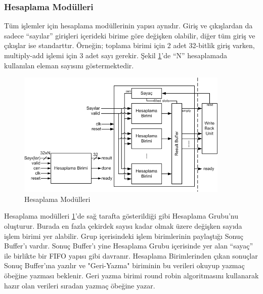 \subsubsection{Hesaplama Modülleri}
Tüm işlemler için hesaplama modüllerinin yapısı aynıdır. Giriş ve çıkışlardan da sadece “sayılar” girişleri içerideki birime göre değişken olabilir, diğer tüm giriş ve çıkışlar ise standarttır. Örneğin; toplama birimi için 2 adet 32-bitlik giriş varken, multiply-add işlemi için 3 adet sayı gerekir. Şekil \ref{image:executionUnitIO}'de “N” hesaplamada kullanılan eleman sayısını göstermektedir.\par
\begin{figure}
\centering
\shorthandoff{=}
\includegraphics[width=0.9\textwidth]{gorsel/executionUnitIO.png}
\shorthandoff{=}
\caption{Hesaplama Modülleri}
\label{image:executionUnitIO}
\end{figure}
Hesaplama modülleri \ref{image:executionUnitIO}'de sağ tarafta gösterildiği gibi Hesaplama Grubu’nu oluşturur. Burada en fazla çekirdek sayısı kadar olmak üzere değişken sayıda işlem birimi yer alabilir. Grup içerisindeki işlem birimlerinin paylaştığı  Sonuç Buffer'ı vardır. Sonuç Buffer'ı yine Hesaplama Grubu içerisinde yer alan “sayaç” ile birlikte bir FIFO yapısı gibi davranır. Hesaplama Birimlerinden çıkan sonuçlar Sonuç Buffer’ına yazılır ve "Geri-Yazma" biriminin bu verileri okuyup yazmaç öbeğine yazması beklenir. Geri yazma birimi round robin algoritmasını kullanarak hazır olan verileri sıradan yazmaç öbeğine yazar.

